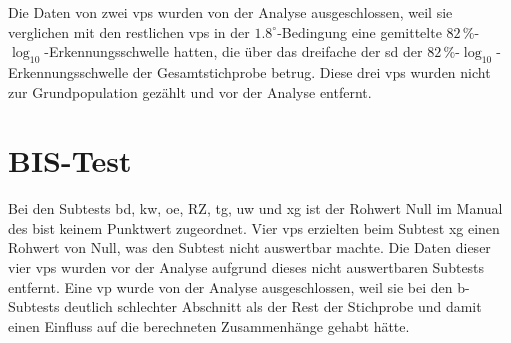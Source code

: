 \documentclass[11pt, twoside, a4paper]{book}		%
\begin{document}
Die Daten von zwei \glspl{vp} wurden von der Analyse ausgeschlossen, weil sie verglichen mit den restlichen \glspl{vp} in der $1.8^{\circ}$-Be\-ding\-ung eine gemittelte $82\,\%$-$\log_{10}$-Er\-ken\-nungs\-schwel\-le hatten, die über das dreifache der \gls{sd} der $82\,\%$-$\log_{10}$-Er\-ken\-nungs\-schwel\-le der Gesamtstichprobe betrug. Diese drei \glspl{vp} wurden nicht zur Grundpopulation gezählt und vor der Analyse entfernt.


\section{BIS-Test}
Bei den Subtests \gls{bd}, \gls{kw}, \gls{oe}, \gls{RZ}, \gls{tg}, \gls{uw} und \gls{xg} ist der Rohwert Null im Manual des \gls{bist} \citep{Jaeger1997} keinem Punktwert zugeordnet. Vier \glspl{vp} erzielten beim Subtest \gls{xg} einen Rohwert von Null, was den Subtest nicht auswertbar machte. Die Daten dieser vier \glspl{vp} wurden vor der Analyse aufgrund dieses nicht auswertbaren Subtests entfernt. Eine \gls{vp} wurde von der Analyse ausgeschlossen, weil sie bei den \gls{b}-Subtests deutlich schlechter Abschnitt als der Rest der Stichprobe und damit einen Einfluss auf die berechneten Zusammenhänge gehabt hätte.
\end{document}
